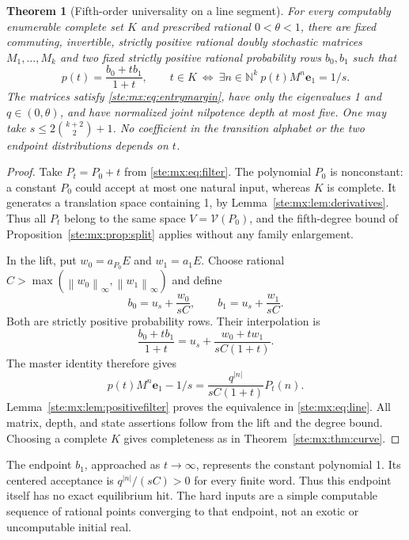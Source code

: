 \documentclass[11pt,letterpaper]{article}
\newtheorem{theorem}{Theorem}[section]
\theoremstyle{definition}
\theoremstyle{remark}
\newcommand{\N}{\mathbb N}
\newcommand{\norm}[1]{\left\lVert #1\right\rVert}
\newcommand{\e}{\mathbf e}
\newcommand{\calV}{\mathcal V}
\begin{document}
\begin{theorem}[Fifth-order universality on a line segment]\label{ste:mx:thm:line}
For every computably enumerable complete set $K$ and prescribed rational
$0<\theta<1$, there are fixed commuting, invertible, strictly positive rational
doubly stochastic matrices $M_1,\ldots,M_k$ and two fixed strictly positive
rational probability rows $b_0,b_1$ such that
\begin{equation}\label{ste:mx:eq:line}
 p(t)=\frac{b_0+t b_1}{1+t},\qquad
 t\in K\ \Longleftrightarrow\
 \exists n\in\N^k\ p(t)M^n\e_1=1/s.
\end{equation}
The matrices satisfy \eqref{ste:mx:eq:entrymargin}, have only the eigenvalues 1 and
$q\in(0,\theta)$, and have normalized joint nilpotence depth at most five.
One may take $s\leq2\binom{k+2}{2}+1$. No coefficient in the transition alphabet
or the two endpoint distributions depends on $t$.
\end{theorem}
\begin{proof}
Take $P_t=P_0+t$ from \eqref{ste:mx:eq:filter}. The polynomial $P_0$ is nonconstant:
a constant $P_0$ could accept at most one natural input, whereas $K$ is complete.
It generates a translation space containing 1, by Lemma~\ref{ste:mx:lem:derivatives}.
Thus all $P_t$ belong to the same space $V=\calV(P_0)$, and the fifth-degree
bound of Proposition~\ref{ste:mx:prop:split} applies without any family enlargement.

In the lift, put $w_0=a_{P_0}E$ and $w_1=a_1E$.
Choose rational $C>\max(\norm{w_0}_\infty,\norm{w_1}_\infty)$ and define
\[
 b_0=u_s+\frac{w_0}{sC},\qquad
 b_1=u_s+\frac{w_1}{sC}.
\]
Both are strictly positive probability rows. Their interpolation is
\[
 \frac{b_0+tb_1}{1+t}
   =u_s+\frac{w_0+tw_1}{sC(1+t)}.
\]
The master identity therefore gives
\begin{equation}\label{ste:mx:eq:linesignal}
 p(t)M^n\e_1-1/s
  =\frac{q^{|n|}}{sC(1+t)}P_t(n).
\end{equation}
Lemma~\ref{ste:mx:lem:positivefilter} proves the equivalence in \eqref{ste:mx:eq:line}.
All matrix, depth, and state assertions follow from the lift and the degree
bound. Choosing a complete $K$ gives completeness as in
Theorem~\ref{ste:mx:thm:curve}.
\end{proof}

The endpoint $b_1$, approached as $t\to\infty$, represents the constant
polynomial 1. Its centered acceptance is $q^{|n|}/(sC)>0$ for every finite
word. Thus this endpoint itself has no exact equilibrium hit. The hard inputs
are a simple computable sequence of rational points converging to that endpoint,
not an exotic or uncomputable initial real.
\end{document}
